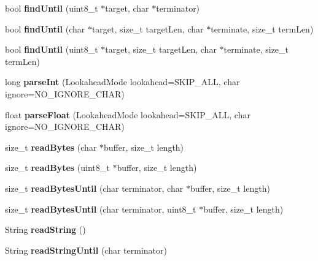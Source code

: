 \begin{DoxyCompactItemize}
\item 
\mbox{\label{class_stream_a167c5236fd76df40d4894aa48e99aa98}} 
bool {\bfseries find\+Until} (uint8\+\_\+t $\ast$target, char $\ast$terminator)
\item 
\mbox{\label{class_stream_a3a9497de614792103ab8cb4759e01a69}} 
bool {\bfseries find\+Until} (char $\ast$target, size\+\_\+t target\+Len, char $\ast$terminate, size\+\_\+t term\+Len)
\item 
\mbox{\label{class_stream_ae644144154e17da36a1b89123847b5b1}} 
bool {\bfseries find\+Until} (uint8\+\_\+t $\ast$target, size\+\_\+t target\+Len, char $\ast$terminate, size\+\_\+t term\+Len)
\item 
\mbox{\label{class_stream_a8875d87ed4db36c36990b2fb22ca48da}} 
long {\bfseries parse\+Int} (Lookahead\+Mode lookahead=S\+K\+I\+P\+\_\+\+A\+LL, char ignore=N\+O\+\_\+\+I\+G\+N\+O\+R\+E\+\_\+\+C\+H\+AR)
\item 
\mbox{\label{class_stream_a685133574afc1c35223e31703543a0a7}} 
float {\bfseries parse\+Float} (Lookahead\+Mode lookahead=S\+K\+I\+P\+\_\+\+A\+LL, char ignore=N\+O\+\_\+\+I\+G\+N\+O\+R\+E\+\_\+\+C\+H\+AR)
\item 
\mbox{\label{class_stream_a45fd1336a323ea83b16e8507055f44ea}} 
size\+\_\+t {\bfseries read\+Bytes} (char $\ast$buffer, size\+\_\+t length)
\item 
\mbox{\label{class_stream_a23dd7428e78e86ff41fce45bd618e214}} 
size\+\_\+t {\bfseries read\+Bytes} (uint8\+\_\+t $\ast$buffer, size\+\_\+t length)
\item 
\mbox{\label{class_stream_af84672a4fb2620466958d3118d4fea00}} 
size\+\_\+t {\bfseries read\+Bytes\+Until} (char terminator, char $\ast$buffer, size\+\_\+t length)
\item 
\mbox{\label{class_stream_a432e1b8520b03a845264789fcb9c1a10}} 
size\+\_\+t {\bfseries read\+Bytes\+Until} (char terminator, uint8\+\_\+t $\ast$buffer, size\+\_\+t length)
\item 
\mbox{\label{class_stream_a1c60bdda2b65d78e5a1362d51b856c5a}} 
String {\bfseries read\+String} ()
\item 
\mbox{\label{class_stream_a6a409da87c552909260d8cc428c5ca70}} 
String {\bfseries read\+String\+Until} (char terminator)
\end{DoxyCompactItemize}
